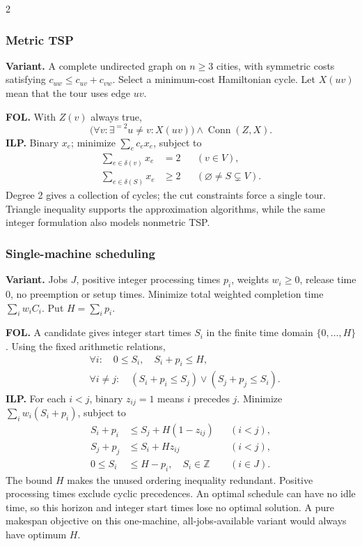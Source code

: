 \documentclass[8pt]{extarticle}
\theoremstyle{definition}
\begin{document}
\begin{multicols*}{2}
\subsubsection{Metric TSP}\label{form:tsp}
\textbf{Variant.} A complete undirected graph on $n\ge3$ cities, with
symmetric costs satisfying $c_{uw}\le c_{uv}+c_{vw}$. Select a minimum-cost
Hamiltonian cycle. Let $X(uv)$ mean that the tour uses edge $uv$.

\textbf{FOL.} With $Z(v)$ always true,
\[
 \bigl(\forall v:\exists^{=2}u\ne v:X(uv)\bigr)
 \land\operatorname{Conn}(Z,X).
\]
\textbf{ILP.} Binary $x_e$; minimize $\sum_e c_ex_e$, subject to
\[
\begin{aligned}
 \sum_{e\in\delta(v)}x_e&=2 &&(v\in V),\\
 \sum_{e\in\delta(S)}x_e&\ge2 &&(\varnothing\ne S\subsetneq V).
\end{aligned}
\]
Degree 2 gives a collection of cycles; the cut constraints force a single
tour. Triangle inequality supports the approximation algorithms, while
the same integer formulation also models nonmetric TSP.

\subsubsection{Single-machine scheduling}\label{form:single}
\textbf{Variant.} Jobs $J$, positive integer processing times $p_i$, weights
$w_i\ge0$, release time 0, no preemption or setup times. Minimize total
weighted completion time $\sum_iw_iC_i$. Put $H=\sum_i p_i$.

\textbf{FOL.} A candidate gives integer start times $S_i$ in the finite
time domain $\{0,\ldots,H\}$. Using the fixed arithmetic relations,
\[
\begin{aligned}
 &\forall i:\quad 0\le S_i,\quad S_i+p_i\le H,\\
 &\forall i\ne j:\quad
 (S_i+p_i\le S_j)\lor(S_j+p_j\le S_i).
\end{aligned}
\]
\textbf{ILP.} For each $i<j$, binary $z_{ij}=1$ means $i$ precedes $j$.
Minimize $\sum_iw_i(S_i+p_i)$, subject to
\[
\begin{aligned}
 S_i+p_i&\le S_j+H(1-z_{ij}) &&(i<j),\\
 S_j+p_j&\le S_i+Hz_{ij} &&(i<j),\\
 0\le S_i&\le H-p_i,\quad S_i\in\mathbb Z &&(i\in J).
\end{aligned}
\]
The bound $H$ makes the unused ordering inequality redundant. Positive
processing times exclude cyclic precedences. An optimal schedule can have
no idle time, so this horizon and integer start times lose no optimal
solution. A pure makespan objective on this one-machine, all-jobs-available
variant would always have optimum $H$.


\end{multicols*}
\end{document}

